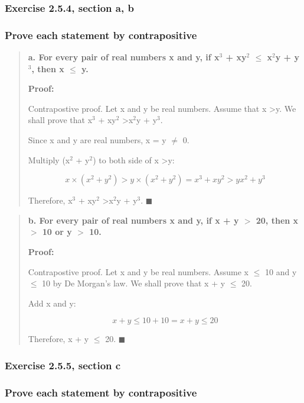 \documentclass[11pt, oneside]{article}
\begin{document}
\subsubsection*{Exercise 2.5.4, section a, b}

\subsubsection*{Prove each statement by contrapositive}

\begin{quote}
    \textbf{a. For every pair of real numbers x and y, if x$^3$ + xy$^2$ $\leq$ x$^2$y + y$^3$, then x $\leq$ y.}
    
    \textbf{Proof:}
    
    Contrapostive proof. Let x and y be real numbers. Assume that x \textgreater\enspace y. We shall prove that x$^3$ + xy$^2$ \textgreater\enspace x$^2$y + y$^3$.
    
    Since x and y are real numbers, x = y $\ne$ 0.
    
    Multiply (x$^2$ + y$^2$) to both side of x \textgreater\enspace y:
    
    \[x \times (x^2 + y ^ 2) > y \times (x^2 + y ^ 2) = x^3 + xy^2 > yx^2 + y^3 \]
    
    Therefore, x$^3$ + xy$^2$ \textgreater\enspace x$^2$y + y$^3$. $\blacksquare$
\end{quote}

\begin{quote}
    \textbf{b. For every pair of real numbers x and y, if x + y $>$ 20, then x $>$ 10 or y $>$ 10.}
    
    \textbf{Proof:}
    
    Contrapostive proof. Let x and y be real numbers. Assume x $\leq$ 10 and y $\leq$ 10 by De Morgan's law. We shall prove that x + y $\leq$ 20.
    
    Add x and y:
    
    \[x + y \leq 10 + 10 = x + y \leq 20\]
    
    Therefore, x + y $\leq$ 20. $\blacksquare$
\end{quote}

\pagebreak

\subsubsection*{Exercise 2.5.5, section c}

\subsubsection*{Prove each statement by contrapositive}
\end{document}
